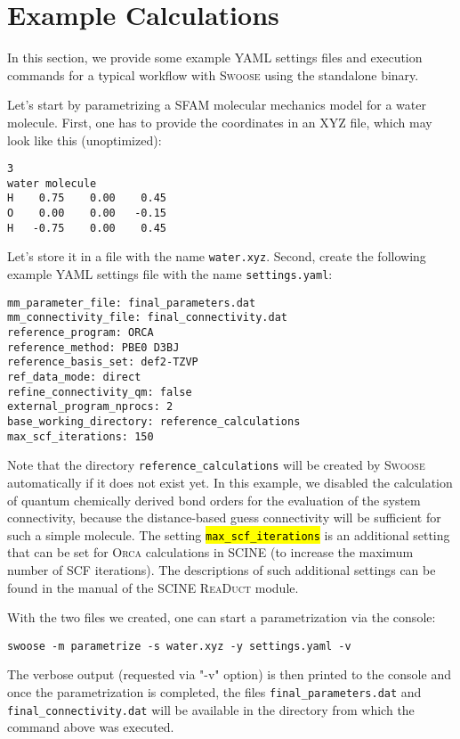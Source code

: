 \documentclass[]{tufte-book}
\begin{document}
{{\chapter{Example Calculations}\label{ch:example_calculations}

In this section, we provide some example YAML settings files and execution commands for a typical workflow with \textsc{Swoose} using the standalone binary.

Let's start by parametrizing a SFAM molecular mechanics model for a water molecule. First, one has to provide the coordinates in an XYZ file, which may look like this (unoptimized):
\begin{mdframed}[backgroundcolor=LightSteelBlue!25, linewidth=0pt]
\begin{verbatim}
3
water molecule
H    0.75    0.00    0.45
O    0.00    0.00   -0.15
H   -0.75    0.00    0.45
\end{verbatim}
\end{mdframed}
Let's store it in a file with the name \texttt{water.xyz}. Second, create the following example YAML settings file with the name \texttt{settings.yaml}:
\begin{mdframed}[backgroundcolor=LightSteelBlue!25, linewidth=0pt]
\begin{verbatim}
mm_parameter_file: final_parameters.dat
mm_connectivity_file: final_connectivity.dat
reference_program: ORCA
reference_method: PBE0 D3BJ
reference_basis_set: def2-TZVP
ref_data_mode: direct
refine_connectivity_qm: false
external_program_nprocs: 2
base_working_directory: reference_calculations
max_scf_iterations: 150
\end{verbatim}
\end{mdframed}
Note that the directory \texttt{reference\_calculations} will be created by \textsc{Swoose} automatically if it does not exist yet. In this example, we disabled the calculation of quantum chemically derived bond orders for the evaluation of the system connectivity, because the distance-based guess connectivity will be sufficient for such a simple molecule. The setting \hl{\texttt{max\_scf\_iterations}} is an additional setting that can be set for \textsc{Orca} calculations in SCINE (to increase the maximum number of SCF iterations). The descriptions of such additional settings can be found in the manual of the SCINE \textsc{ReaDuct} module\cite{readuct}.

With the two files we created, one can start a parametrization via the console:
\begin{mdframed}[backgroundcolor=LightSteelBlue!25, linewidth=0pt]
\begin{verbatim}
swoose -m parametrize -s water.xyz -y settings.yaml -v
\end{verbatim}
\end{mdframed}
The verbose output (requested via "-v" option) is then printed to the console and once the parametrization is completed, the files \texttt{final\_parameters.dat} and \texttt{final\_connectivity.dat} will be available in the directory from which the command above was executed.

}}
\end{document}
